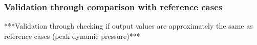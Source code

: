 \subsubsection{Validation through comparison with reference cases}
\label{sec:astroval}
***Validation through checking if output values are approximately the same as reference cases (peak dynamic pressure)***\\

%
